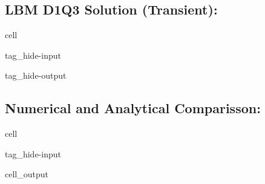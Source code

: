 \documentclass[letterpaper,10pt,english,openany,oneside]{jupyterBook}
\begin{document}
\subsection{LBM D1Q3 Solution (Transient):}
\label{\detokenize{LBM-Study/Poisson-Equation:lbm-d1q3-solution-transient}}
\begin{sphinxuseclass}{cell}
\begin{sphinxuseclass}{tag_hide-input}
\begin{sphinxuseclass}{tag_hide-output}
\end{sphinxuseclass}
\end{sphinxuseclass}
\end{sphinxuseclass}

\subsection{Numerical and Analytical Comparisson:}
\label{\detokenize{LBM-Study/Poisson-Equation:numerical-and-analytical-comparisson}}
\begin{sphinxuseclass}{cell}
\begin{sphinxuseclass}{tag_hide-input}\begin{sphinxVerbatimOutput}

\begin{sphinxuseclass}{cell_output}
\noindent{}

\end{sphinxuseclass}\end{sphinxVerbatimOutput}

\end{sphinxuseclass}
\end{sphinxuseclass}
\end{document}
